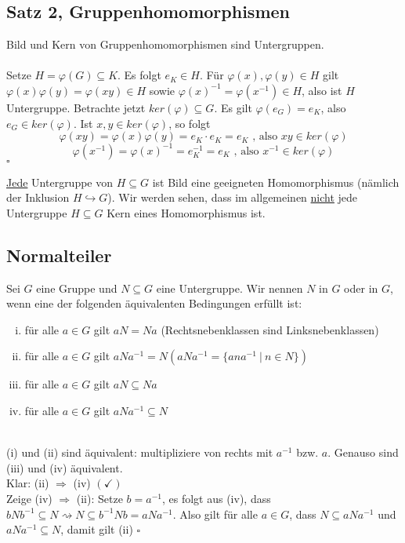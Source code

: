 \subsection{Satz 2, Gruppenhomomorphismen}
\label{sub:satz_ghm}
Bild und Kern von Gruppenhomomorphismen sind Untergruppen.\\

\\
Setze $H=\varphi(G)\subseteq K$. Es folgt $e_K \in H$. Für $\varphi(x),\varphi(y)\in H$ gilt $\varphi(x)\varphi(y)=\varphi(xy)\in H$ sowie $\varphi(x)^{-1}=\varphi(x^{-1}) \in H$, also ist $H$ Untergruppe. Betrachte jetzt $ker(\varphi)\subseteq G$. Es gilt $\varphi(e_G)=e_K$, also $e_G \in ker(\varphi)$. Ist $x,y \in ker(\varphi)$, so folgt 
\[\varphi(xy)=\varphi(x)\varphi(y)=e_K \cdot e_K=e_K \text{ , also } xy \in ker(\varphi)\]
\[\varphi(x^{-1})=\varphi(x)^{-1}=e_K^{-1}=e_K \text{ , also } x^{-1} \in ker(\varphi) \]
\hfill $\square$

\uline{Jede} Untergruppe von $H\subseteq G$ ist Bild eine geeigneten Homomorphismus (nämlich der Inklusion $H \hookrightarrow G$). Wir werden sehen, dass im allgemeinen \uline{nicht} jede Untergruppe $H\subseteq G$ Kern eines Homomorphismus ist.

\subsection{Normalteiler}
\label{sub:normalteiler}
Sei $G$ eine Gruppe und $N\subseteq G$ eine Untergruppe. Wir nennen $N$  in $G$ oder  in $G$, wenn eine der folgenden äquivalenten Bedingungen erfüllt ist:
\begin{enumerate}[(i)]
	\item für alle $a\in G$ gilt $aN=Na$ (Rechtsnebenklassen sind Linksnebenklassen)
	\item für alle $a\in G$ gilt $aNa^{-1}=N (aNa^{-1}=\{ana^{-1}~|~n\in N \})$
	\item für alle $a\in G$ gilt $aN\subseteq Na$
	\item für alle $a\in G$ gilt $aNa^{-1}\subseteq N$
\end{enumerate}

\\
(i) und (ii) sind äquivalent: multipliziere von rechts mit $a^{-1}$ bzw. $a$. Genauso sind (iii) und (iv) äquivalent.\\
Klar: (ii) $\Rightarrow$ (iv) $(\checkmark)$\\
Zeige (iv) $\Rightarrow$ (ii): Setze $b=a^{-1}$, es folgt aus (iv), dass $bNb^{-1}\subseteq N \rightsquigarrow N\subseteq b^{-1}Nb=aNa^{-1}$. Also gilt für alle $a\in G$, dass $N\subseteq aNa^{-1}$ und $aNa^{-1}\subseteq N$, damit gilt (ii)
\hfill $\square$

